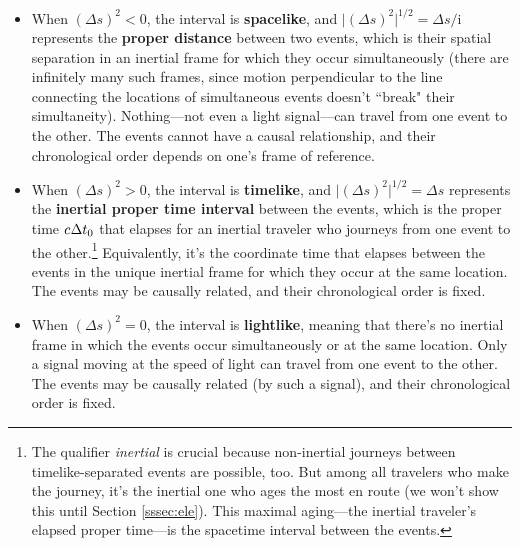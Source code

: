 \documentclass[12pt]{article}
\begin{document}
\begin{itemize}
\item When $(\Delta s)^2<0$, the interval is \textbf{spacelike}, and $\lvert (\Delta s)^2 \rvert ^{1/2} = \Delta s / \mathrm{i}$ represents the \textbf{proper distance} between two events, which is their spatial separation in an inertial frame for which they occur simultaneously (there are infinitely many such frames, since motion perpendicular to the line connecting the locations of simultaneous events doesn't ``break" their simultaneity). Nothing---not even a light signal---can travel from one event to the other. The events cannot have a causal relationship, and their chronological order depends on one's frame of reference.
\item When $(\Delta s)^2>0$, the interval is \textbf{timelike}, and $\lvert(\Delta s)^2\rvert ^{1/2} = \Delta s $ represents the \textbf{inertial proper time interval} between the events, which is the proper time $c \mkern.5mu \Delta t_0$ that elapses for an inertial traveler who journeys from one event to the other.\footnote{\label{fn:pma}The qualifier \emph{inertial} is crucial because non-inertial journeys between timelike-separated events are possible, too. But among all travelers who make the journey, it's the inertial one who ages the most en route (we won't show this until Section \ref{sssec:ele}). This maximal aging---the inertial traveler's elapsed proper time---is the spacetime interval between the events.} Equivalently, it's the coordinate time that elapses between the events in the unique inertial frame for which they occur at the same location. The events may be causally related, and their chronological order is fixed.
\item When $(\Delta s)^2=0$, the interval is \textbf{lightlike}, meaning that there's no inertial frame in which the events occur simultaneously or at the same location. Only a signal moving at the speed of light can travel from one event to the other. The events may be causally related (by such a signal), and their chronological order is fixed.
\end{itemize}
\end{document}
